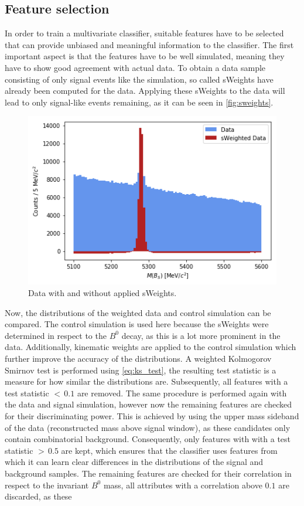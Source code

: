 \subsection{Feature selection}
In order to train a multivariate classifier, suitable features have to be selected that can provide unbiased and meaningful information to the classifier.
The first important aspect is that the features have to be well simulated, meaning they have to show good agreement with actual data. To obtain a data sample consisting of only signal
events like the simulation, so called sWeights have already been computed for the data. Applying these sWeights to the data will lead to only signal-like events remaining, as 
it can be seen in \autoref{fig:sweights}.
\begin{figure}[H]
	\centering
	\includegraphics[width=0.5\linewidth]{plots/sweights.png}
	\caption{Data with and without applied sWeights.}
	\label{fig:sweights}
\end{figure}
Now, the distributions of the weighted data and control simulation can be compared. The control simulation is used here because the sWeights were determined in respect to the
$B^0$ decay, as this is a lot more prominent in the data. Additionally, kinematic weights are applied to the control simulation which further improve the accuracy of the distributions.
A weighted Kolmogorov Smirnov test is performed using \eqref{eq:ks_test}, the resulting test statistic is a measure for how similar the distributions are. 
Subsequently, all features with a test statistic $< \, 0.1$ are removed. 
The same procedure is performed again with the data and signal simulation, however now the remaining features are checked for their discriminating power.
This is achieved by using the upper mass sideband of the data (reconstructed mass above signal window), as these candidates only contain combinatorial background. Consequently,
only features with with a test statistic $> \, 0.5$ are kept, which ensures that the classifier uses features from which it can learn clear differences in the distributions of the signal and background samples.
The remaining features are checked for their correlation in respect to the invariant $B^0$ mass, all attributes with a correlation above $0.1$ are discarded, as these
